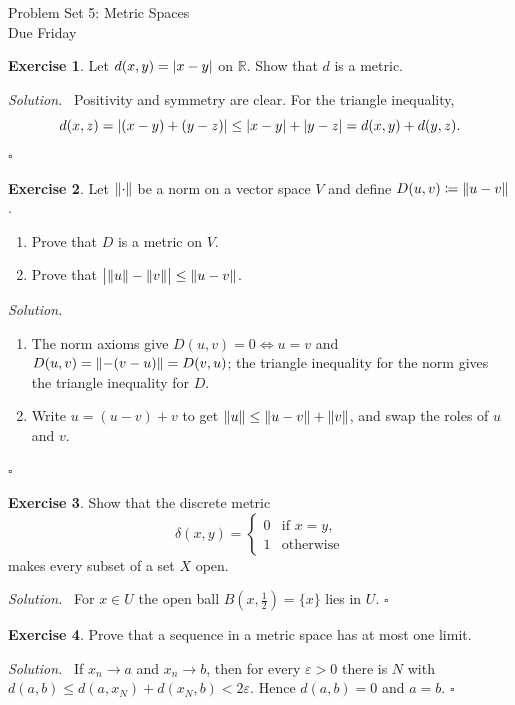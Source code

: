 \documentclass{article}
\DeclarePairedDelimiter{\abs}{\lvert}{\rvert}
\DeclarePairedDelimiter{\norm}{\lVert}{\rVert}
\theoremstyle{definition}
\newtheorem{exercise}{Exercise}
\newenvironment{solution}
  {\par\noindent\textit{Solution.}\ }
  {\hfill$\square$\par\medskip}
\begin{document}
\begin{center}
  {\Large Problem Set 5: Metric Spaces}\\[4pt]
  Due Friday
\end{center}

\begin{exercise}
Let $d(x,y) = \abs{x - y}$ on $\mathbb{R}$. Show that $d$ is a metric.
\end{exercise}

\begin{solution}
Positivity and symmetry are clear. For the triangle inequality,
\[
  d(x,z) = \abs{(x-y) + (y-z)} \le \abs{x-y} + \abs{y-z} = d(x,y) + d(y,z).
\]
\end{solution}

\begin{exercise}
Let $\norm{\cdot}$ be a norm on a vector space $V$ and define
$D(u,v) \coloneqq \norm{u - v}$.
\begin{enumerate}[label=(\alph*)]
  \item Prove that $D$ is a metric on $V$.
  \item Prove that $\abs[\big]{\norm{u} - \norm{v}} \le \norm{u - v}$.
\end{enumerate}
\end{exercise}

\begin{solution}
\begin{enumerate}[label=(\alph*)]
  \item The norm axioms give $D(u,v) = 0 \iff u = v$ and
        $D(u,v) = \norm{-(v-u)} = D(v,u)$; the triangle inequality for the
        norm gives the triangle inequality for $D$.
  \item Write $u = (u - v) + v$ to get $\norm{u} \le \norm{u-v} + \norm{v}$,
        and swap the roles of $u$ and $v$.
\end{enumerate}
\end{solution}

\begin{exercise}
Show that the discrete metric
\[
  \delta(x,y) =
  \begin{cases}
    0 & \text{if } x = y,\\
    1 & \text{otherwise}
  \end{cases}
\]
makes every subset of a set $X$ open.
\end{exercise}

\begin{solution}
For $x \in U$ the open ball $B(x, \tfrac12) = \{x\}$ lies in $U$.
\end{solution}

\begin{exercise}
Prove that a sequence in a metric space has at most one limit.
\end{exercise}

\begin{solution}
If $x_n \to a$ and $x_n \to b$, then for every $\varepsilon > 0$ there is
$N$ with $d(a,b) \le d(a,x_N) + d(x_N,b) < 2\varepsilon$. Hence
$d(a,b) = 0$ and $a = b$.
\end{solution}
\end{document}
